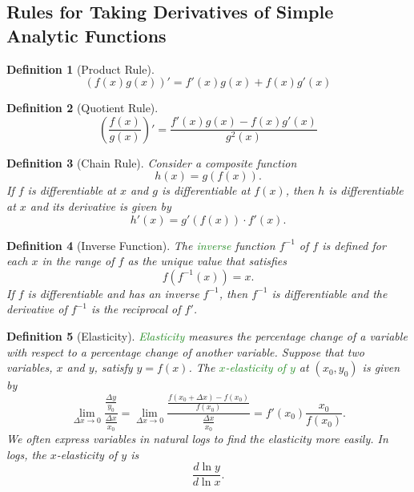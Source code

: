 \documentclass[11pt]{article}
\newtheorem*{definition}{Definition}
\newcommand{\gr}{\textcolor{ForestGreen}}
\begin{document}
\subsection{Rules for Taking Derivatives of Simple Analytic Functions}
\label{sec:org6e90fe4}
\begin{definition}[Product Rule]
\[
\left(f(x)g(x)\right)' = f'(x)g(x) + f(x)g'(x)
\]
\end{definition}
\begin{definition}[Quotient Rule]
\[
\left(\frac{f(x)}{g(x)}\right)' = \frac{f'(x)g(x) - f(x)g'(x)}{g^2(x)}
\]
\end{definition}
\begin{definition}[Chain Rule]
Consider a composite function 
\[
h(x) = g(f(x)).
\]
If $f$ is differentiable at $x$ and $g$ is differentiable at $f(x)$, then $h$ is differentiable at $x$ and its derivative is given by
\[
h'(x) = g'(f(x)) \cdot f'(x).
\]
\end{definition}

\begin{definition}[Inverse Function]
The \gr{inverse} function $f^{-1}$ of $f$ is defined for each $x$ in the range of $f$ as the unique value that satisfies
\[
f(f^{-1}(x)) = x.
\]
If $f$ is differentiable and has an inverse $f^{-1}$, then $f^{-1}$ is differentiable and the derivative of $f^{-1}$ is the reciprocal of $f'$.
\end{definition}

\begin{definition}[Elasticity]
\gr{Elasticity} measures the percentage change of a variable with respect to a percentage change of another variable. Suppose that two variables, $x$ and $y$, satisfy $y = f(x)$. The \gr{$x$-elasticity of $y$} at $(x_0, y_0)$ is given by 
\[
\underset{\Delta x \to 0}{\lim} \frac{\frac{\Delta y}{y_0}}{\frac{\Delta x}{x_0}} = \underset{\Delta x \to 0}{\lim} \frac{\frac{f(x_0 + \Delta x) - f(x_0)}{f(x_0)}}{\frac{\Delta x}{x_0}} = f'(x_0) \frac{x_0}{f(x_0)}.
\]
We often express variables in natural logs to find the elasticity more easily. In logs, the $x$-elasticity of $y$ is
\[
\frac{d \ln y}{d \ln x}.
\]
\end{definition}
\end{document}
